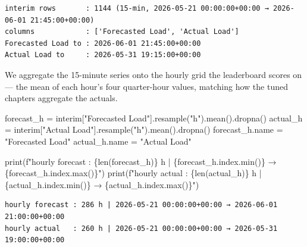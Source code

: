 \documentclass[
  english,
  letterpaper,
]{scrbook}
\newenvironment{Shaded}{\begin{snugshade}}{\end{snugshade}}
\newcommand{\BuiltInTok}[1]{\textcolor[rgb]{0.00,0.23,0.31}{#1}}
\newcommand{\NormalTok}[1]{\textcolor[rgb]{0.00,0.23,0.31}{#1}}
\newcommand{\OperatorTok}[1]{\textcolor[rgb]{0.37,0.37,0.37}{#1}}
\newcommand{\SpecialCharTok}[1]{\textcolor[rgb]{0.37,0.37,0.37}{#1}}
\newcommand{\SpecialStringTok}[1]{\textcolor[rgb]{0.13,0.47,0.30}{#1}}
\newcommand{\StringTok}[1]{\textcolor[rgb]{0.13,0.47,0.30}{#1}}
\begin{document}
\begin{verbatim}
interim rows       : 1144 (15-min, 2026-05-21 00:00:00+00:00 → 2026-06-01 21:45:00+00:00)
columns            : ['Forecasted Load', 'Actual Load']
Forecasted Load to : 2026-06-01 21:45:00+00:00
Actual Load to     : 2026-05-31 19:15:00+00:00
\end{verbatim}

We aggregate the 15-minute series onto the hourly grid the leaderboard
scores on --- the mean of each hour's four quarter-hour values, matching
how the tuned chapters aggregate the actuals.

\protect{}\label{entsoe-hourly}
\begin{Shaded}
\begin{Highlighting}[]
\NormalTok{forecast\_h }\OperatorTok{=}\NormalTok{ interim[}\StringTok{"Forecasted Load"}\NormalTok{].resample(}\StringTok{"h"}\NormalTok{).mean().dropna()}
\NormalTok{actual\_h }\OperatorTok{=}\NormalTok{ interim[}\StringTok{"Actual Load"}\NormalTok{].resample(}\StringTok{"h"}\NormalTok{).mean().dropna()}
\NormalTok{forecast\_h.name }\OperatorTok{=} \StringTok{"Forecasted Load"}
\NormalTok{actual\_h.name }\OperatorTok{=} \StringTok{"Actual Load"}

\BuiltInTok{print}\NormalTok{(}\SpecialStringTok{f"hourly forecast : }\SpecialCharTok{\{}\BuiltInTok{len}\NormalTok{(forecast\_h)}\SpecialCharTok{\}}\SpecialStringTok{ h | }\SpecialCharTok{\{}\NormalTok{forecast\_h}\SpecialCharTok{.}\NormalTok{index}\SpecialCharTok{.}\BuiltInTok{min}\NormalTok{()}\SpecialCharTok{\}}\SpecialStringTok{ → }\SpecialCharTok{\{}\NormalTok{forecast\_h}\SpecialCharTok{.}\NormalTok{index}\SpecialCharTok{.}\BuiltInTok{max}\NormalTok{()}\SpecialCharTok{\}}\SpecialStringTok{"}\NormalTok{)}
\BuiltInTok{print}\NormalTok{(}\SpecialStringTok{f"hourly actual   : }\SpecialCharTok{\{}\BuiltInTok{len}\NormalTok{(actual\_h)}\SpecialCharTok{\}}\SpecialStringTok{ h | }\SpecialCharTok{\{}\NormalTok{actual\_h}\SpecialCharTok{.}\NormalTok{index}\SpecialCharTok{.}\BuiltInTok{min}\NormalTok{()}\SpecialCharTok{\}}\SpecialStringTok{ → }\SpecialCharTok{\{}\NormalTok{actual\_h}\SpecialCharTok{.}\NormalTok{index}\SpecialCharTok{.}\BuiltInTok{max}\NormalTok{()}\SpecialCharTok{\}}\SpecialStringTok{"}\NormalTok{)}
\end{Highlighting}
\end{Shaded}

\begin{verbatim}
hourly forecast : 286 h | 2026-05-21 00:00:00+00:00 → 2026-06-01 21:00:00+00:00
hourly actual   : 260 h | 2026-05-21 00:00:00+00:00 → 2026-05-31 19:00:00+00:00
\end{verbatim}
\end{document}
